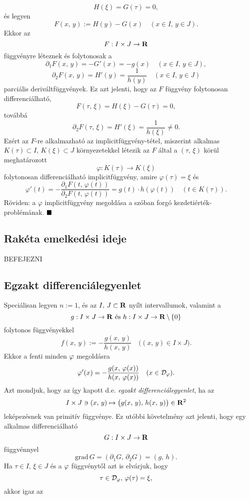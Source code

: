 \[
H(\xi) = G(\tau) = 0,
\]
és legyen
\[
F(x, \, y) := H(y) - G(x) \quad (x \in I, \, y \in J).
\]
Ekkor az
\[
F : I \times J \to \mathbf{R}
\]
függvényre léteznek és folytonosak a
\[
\partial_1 F(x, \, y) = -G'(x) = -g(x) \quad (x \in I, \, y \in J),
\]
\[
\partial_2 F(x, \, y) = H'(y) = \frac{1}{h(y)} \quad (x \in I, \, y \in J)
\]
parciális deriváltfüggvények. Ez azt jelenti, hogy az $F$ függvény folytonosan differenciálható,
\[
F(\tau, \, \xi) = H(\xi) - G(\tau) = 0,
\]
továbbá
\[
\partial_2 F(\tau, \, \xi) = H'(\xi) = \frac{1}{h(\xi)} \neq 0.
\]
Ezért az $F$-re alkalmazható az implicitfüggvény-tétel, miszerint alkalmas $K(\tau) \subset I, \, K(\xi) \subset J$ környezetekkel létezik az $F$ által a $(\tau, \, \xi)$ körül meghatározott
\[
\varphi : K(\tau) \to K(\xi)
\]
folytonosan differenciálható implicitfüggvény, amire $\varphi(\tau) = \xi$ és
\[
\varphi'(t) = -\frac{\partial_1 F(t, \, \varphi(t))}{\partial_2 F(t, \, \varphi(t))} = g(t) \cdot h(\varphi(t)) \quad (t \in K(\tau)).
\]
Röviden: a $\varphi$ implicitfüggvény megoldása a szóban forgó kezdetiérték-problémának.
$\hfill \blacksquare$

\subsection{Rakéta emelkedési ideje}
BEFEJEZNI


\subsection{Egzakt differenciálegyenlet}
Speciálisan legyen $n := 1$, és az $I, \, J \subset \mathbf{R}$ nyílt intervallumok, valamint a
\[
	g : I \times J \to \mathbf{R} \text{ és } h : I \times J \to \mathbf{R} \, \backslash \, \{0\}
\]
folytonos függvényekkel
\[
	f(x, \, y) := - \frac{g(x, \, y)}{h(x, \, y)} \quad \big( (x, \, y) \in I \times J \big).
\]
Ekkor a fenti minden $\varphi$ megoldásra
\[
	\varphi'(x) = - \frac{g(x, \, \varphi(x))}{h(x, \, \varphi(x))} \quad (x \in \mathcal{D}_\varphi).
\]
Azt mondjuk, hogy az így kapott d.e. \textit{egzakt differenciálegyenlet}, ha az
\[
	I \times J \ni (x, \, y) \mapsto \big( g(x, \, y), \, h(x, \, y) \big) \in \mathbf{R}^2
\]
leképezésnek van primitív függvénye. Ez utóbbi követelmény azt jelenti, hogy egy alkalmas differenciálható
\[
	G : I \times J \to \mathbf{R}
\]
függvénnyel 
\[
	\text{grad} \, G = (\partial_1 G, \, \partial_2 G) = (g, \, h).
\]
Ha $\tau \in I, \, \xi \in J$ és a $\varphi$ függvénytől azt is elvárjuk, hogy
\[
	\tau \in \mathcal{D}_\varphi, \, \varphi(\tau) = \xi,
\]
akkor igaz az\\

